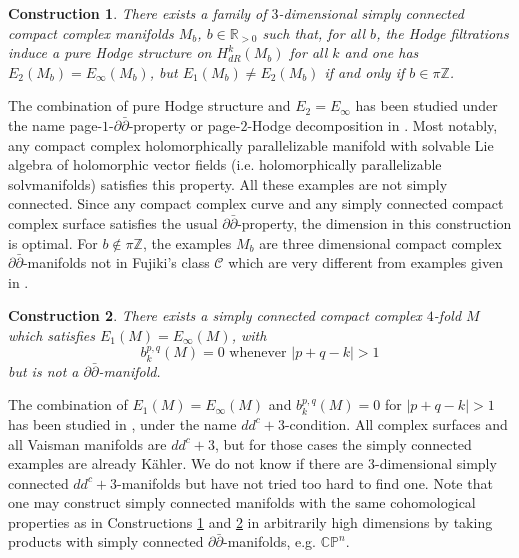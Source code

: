 \documentclass[12pt,reqno]{amsart}
\newtheorem{constr}{Construction}
\theoremstyle{definition}
\newcommand{\Z}{\mathbb{Z}}
\newcommand{\R}{\mathbb{R}}
\newcommand{\CP}{\mathbb{CP}}
\newcommand{\del}{\partial}
\newcommand{\delbar}{\bar{\del}}
\begin{document}
\begin{constr}\label{constr: p1ddbar}
There exists a family of $3$-dimensional simply connected compact complex manifolds $M_b$, $b\in \R_{>0}$ such that, for all $b$, the Hodge filtrations induce a pure Hodge structure on $H_{dR}^k(M_b)$ for all $k$ and one has $E_2(M_b)=E_{\infty}(M_b)$, but $E_1(M_b)\neq E_2(M_b)$ if and only if $b\in\pi\Z$.
\end{constr}

The combination of pure Hodge structure and $E_2=E_\infty$ has been studied under the name page-$1$-$\del\delbar$-property or page-$2$-Hodge decomposition in \cite{PSU21, PSU22, KS23}. Most notably, any compact complex holomorphically parallelizable manifold with solvable Lie algebra of holomorphic vector fields (i.e. holomorphically parallelizable solvmanifolds) satisfies this property. All these examples are not simply connected. Since any compact complex curve and any simply connected compact complex surface satisfies the usual $\del\delbar$-property, the dimension in this construction is optimal. For $b\not\in\pi\Z$, the examples $M_b$ are three dimensional compact complex  $\del\delbar$-manifolds not in Fujiki's class $\mathcal C$ which are very different from examples given in \cite{Fri}.




\begin{constr}\label{constr: ddc+3}
There exists a simply connected compact complex $4$-fold $M$ which satisfies $E_1(M)=E_{\infty}(M)$, with
\[
b_k^{p,q}(M)=0\text{ whenever }|p+q-k|> 1
\]
but  is not a $\del\delbar$-manifold.
\end{constr}
The combination of $E_1(M)=E_{\infty}(M)$ and $b_k^{p,q}(M)=0$ for $|p+q-k|>1$ has been studied in \cite{SW22}, under the name $dd^c+3$-condition. All complex surfaces and all Vaisman manifolds are $dd^c+3$, but for those cases the simply connected examples are already K\"ahler. We do not know if there are $3$-dimensional simply connected $dd^c+3$-manifolds but have not tried too hard to find one. Note that one may construct simply connected manifolds with the same cohomological properties as in Constructions \ref{constr: p1ddbar} and \ref{constr: ddc+3} in arbitrarily high dimensions by taking products with simply connected $\del\delbar$-manifolds, e.g. $\CP^n$.
\end{document}
